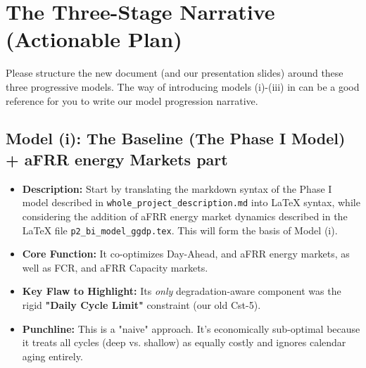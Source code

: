 \documentclass[11pt, a4paper]{article}
\begin{document}
\section{The Three-Stage Narrative (Actionable Plan)}
Please structure the new document (and our presentation slides) around these three progressive models. The way of introducing models (i)-(iii) in \cite{collath2023} can be a good reference for you to write our model progression narrative.

\subsection{Model (i): The Baseline (The Phase I Model) + aFRR energy Markets part}
\begin{itemize}
    \item \textbf{Description:} Start by translating the markdown syntax of the Phase I model described in \texttt{whole\_project\_description.md} \cite{huawei2025} into LaTeX syntax, while considering the addition of aFRR energy market dynamics described in the LaTeX file \texttt{p2\_bi\_model\_ggdp.tex}. This will form the basis of Model (i).
    \item \textbf{Core Function:} It co-optimizes Day-Ahead, and aFRR energy markets, as well as FCR, and aFRR Capacity markets.
    \item \textbf{Key Flaw to Highlight:} Its \emph{only} degradation-aware component was the rigid \textbf{"Daily Cycle Limit"} constraint (our old Cst-5).
    \item \textbf{Punchline:} This is a "naive" approach. It's economically sub-optimal because it treats all cycles (deep vs. shallow) as equally costly and ignores calendar aging entirely.
\end{itemize}
\end{document}
